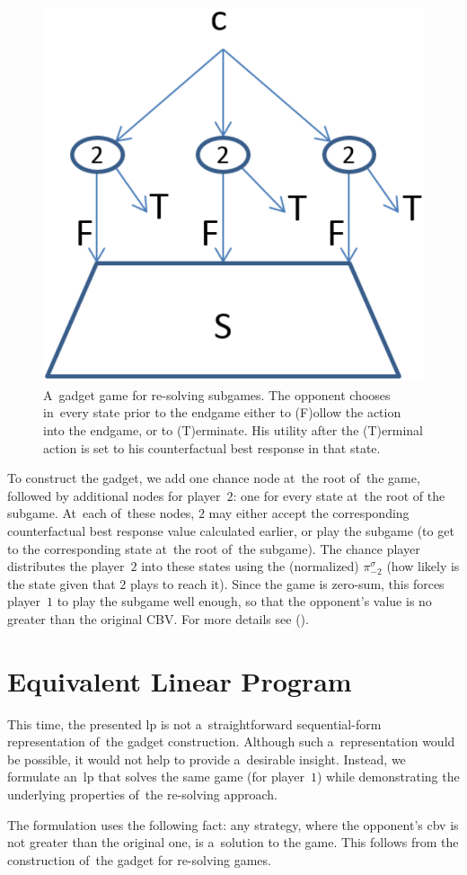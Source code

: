 \begin{figure}[H]
  \centering
  \includegraphics[width=.3\textwidth]{../img/re-solving-game-gadget.png}
  \def\captionTitle{A~gadget game for re-solving subgames}
  \caption[\captionTitle]{
    \captionTitle.
    The opponent chooses in~every state prior to the endgame either to (F)ollow the action into the endgame, or to (T)erminate.
    His utility after the (T)erminal action is set to his counterfactual best response in that state.
  }
  \label{fig:re-solving-gadget}
\end{figure}

To construct the gadget, we add one chance node at~the root of~the game, followed by additional nodes for player~$2$:
one for every state at~the root of the subgame.
At~each of~these nodes, $2$ may either accept the corresponding counterfactual best response value calculated earlier, or play the subgame (to get to the corresponding state at~the root of~the subgame).
The chance player distributes the player~$2$ into these states using the (normalized) $\pi^\sigma_{-2}$ (how likely is the state given that $2$ plays to reach it).
Since the game is zero-sum, this forces player~$1$ to play the subgame well enough, so that the opponent's value is no greater than the original CBV.
For more details see (\cite{BurchJohansonBowling13}).

\section{Equivalent Linear Program}
This time, the presented \acrshort{lp} is not a~straightforward sequential-form representation of~the gadget construction.
Although such a~representation would be possible, it would not help to provide a~desirable insight.
Instead, we formulate an~\acrshort{lp} that solves the same game (for player~$1$) while demonstrating the underlying properties of~the re-solving approach.

The formulation uses the following fact:
any strategy, where the opponent's \acrshort{cbv} is not greater than the original one, is a~solution to the game.
This follows from the construction of~the gadget for re-solving games.

